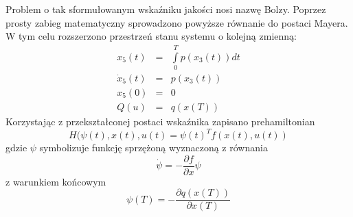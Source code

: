 Problem o tak sformułowanym wskaźniku jakości nosi nazwę Bolzy. Poprzez prosty zabieg matematyczny sprowadzono powyższe równanie do postaci Mayera. W tym celu rozszerzono przestrzeń stanu systemu o kolejną zmienną:
\begin{equation}
\begin{aligned}
x_5(t)&=&\int\limits_{0}^{T}p(x_3(t))dt \\
\dot{x}_5(t)&=&p(x_3(t))\\
x_5(0)&=&0\\
Q(u)&=&q(x(T))
\end{aligned}
\end{equation}
Korzystając z przekształconej postaci wskaźnika zapisano prehamiltonian
\begin{equation}
H(\psi(t),x(t),u(t)=\psi(t)^Tf(x(t),u(t))
\end{equation}
gdzie $\psi$ symbolizuje funkcję sprzężoną wyznaczoną z równania
\begin{equation}
\dot \psi=-\frac{\partial f}{\partial x}\psi
\end{equation}
z warunkiem końcowym
\begin{equation}
\psi(T)=-\frac{\partial q(x(T))}{\partial x(T)}
\end{equation}

